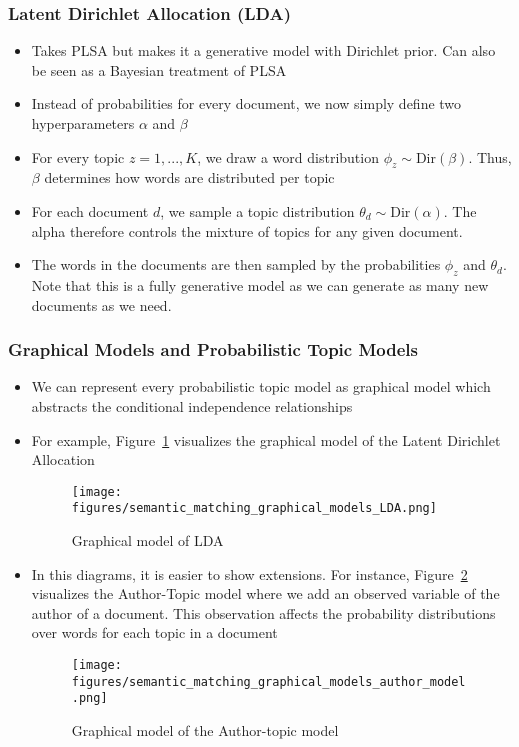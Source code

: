 \subsubsection{Latent Dirichlet Allocation (LDA)}
\begin{itemize}
	\item Takes PLSA but makes it a generative model with Dirichlet prior. Can also be seen as a Bayesian treatment of PLSA
	\item Instead of probabilities for every document, we now simply define two hyperparameters $\alpha$ and $\beta$
	\item For every topic $z=1,...,K$, we draw a word distribution $\phi_z \sim \text{Dir}(\beta)$. Thus, $\beta$ determines how words are distributed per topic
	\item For each document $d$, we sample a topic distribution $\theta_d \sim \text{Dir}(\alpha)$. The alpha therefore controls the mixture of topics for any given document.
	\item The words in the documents are then sampled by the probabilities $\phi_z$ and $\theta_d$. Note that this is a fully generative model as we can generate as many new documents as we need.
\end{itemize}
\subsubsection{Graphical Models and Probabilistic Topic Models}
\begin{itemize}
	\item We can represent every probabilistic topic model as graphical model which abstracts the conditional independence relationships
	\item For example, Figure~\ref{img:semantic_matching_graphical_models_LDA} visualizes the graphical model of the Latent Dirichlet Allocation
	\begin{figure}[ht]
		\centering
		\texttt{[image: figures/semantic\_matching\_graphical\_models\_LDA.png]}
		\caption{Graphical model of LDA}
		\label{img:semantic_matching_graphical_models_LDA}
	\end{figure}
	\item In this diagrams, it is easier to show extensions. For instance, Figure~\ref{img:semantic_matching_graphical_models_author_model} visualizes the Author-Topic model where we add an observed variable of the author of a document. This observation affects the probability distributions over words for each topic in a document 
	\begin{figure}[ht]
		\centering
		\texttt{[image: figures/semantic\_matching\_graphical\_models\_author\_model.png]}
		\caption{Graphical model of the Author-topic model}
		\label{img:semantic_matching_graphical_models_author_model}
	\end{figure}
\end{itemize}